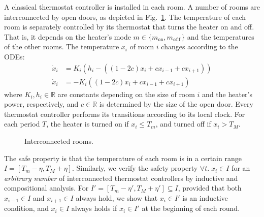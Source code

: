 A classical thermostat controller  \cite{henzinger2000theory} is installed in each room.
A number of rooms are interconnected by open doors, 
as depicted in Fig.~\ref{fig:adj-rooms}.
The temperature of each room is separately controlled by its thermostat that turns the heater on and off.
That is, it %
depends on
the heater's mode $m \in \{m_\texttt{on}, m_\texttt{off}\}$  and the temperatures of the other rooms.
The temperature $x_i$ of room $i$
changes according to the ODEs:
\begin{align*}
\dot{x}_i &= K_i (h_i - ((1- 2 c) x_i + c x_{i-1} + c x_{i+1}))
\\
\dot{x}_i &= - K_i ((1- 2 c) x_i + c x_{i-1} + c x_{i+1})
\end{align*}
where $K_i, h_i \in \mathbb{R}$ are constants depending on
the size of room $i$ and the heater's power, respectively,
and $c \in \mathbb{R}$ is determined by the size of the open door.
%
Every thermostat controller performs its transitions
according to its local clock.
For each period $T$, 
the heater is turned on if $x_i \leq T_m$,
and turned off if $x_i > T_M$.

\begin{figure}
\centering
{}
\caption{Interconnected rooms. %
} \label{fig:adj-rooms}
\end{figure}

The safe property is that the temperature of each room
is in a certain range $I = [T_m - \eta, T_M + \eta]$.
Similarly, we verify the safety property $\forall t.\; x_i \in I$
for an \emph{arbitrary number} of interconnected thermostat controllers
by inductive and compositional analysis.
For %
$I' = [T_m - \eta', T_M + \eta']\subseteq I$,
provided that both $x_{i-1} \in I$ and $x_{i+1} \in I$ always hold,
we show that $x_i \in I'$ is an inductive condition,
and $x_i \in I$ always holds
if $x_i \in I'$ at the beginning of each round.


